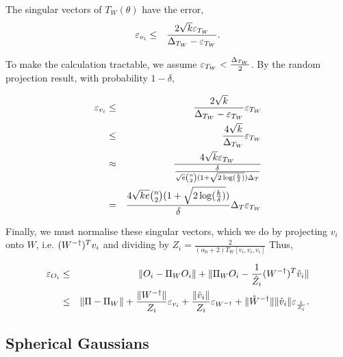 The singular vectors of $T_W(\theta)$ have the error,
\begin{eqnarray}
  \varepsilon_{v_i} 
    &\le& \frac{2 \sqrt{k} \varepsilon_{T_W}}{\Delta_{T_W} - \varepsilon_{T_W}}.
\end{eqnarray}

To make the calculation tractable, we assume $\varepsilon_{T_W}
< \frac{\Delta_{T_W}}{2}$. By the random projection result, with probability $1-\delta$,  

\begin{eqnarray}
  \varepsilon_{v_i} 
    &\le& \frac{2 \sqrt{k}}{\Delta_{T_W} - \varepsilon_{T_W}}  \varepsilon_{T_W}\\
    &\le& \frac{4 \sqrt{k}}{\Delta_{T_W}}  \varepsilon_{T_W}\\
    &\approx& \frac{4 \sqrt{k} \varepsilon_{T_W}}{\frac{\delta}{\sqrt{e} \binom{n}{2} (1 + \sqrt{2\log(\frac{k}{\delta})}) \Delta_{T}}} \\
    &=& \frac{4 \sqrt{ke} \binom{n}{2} (1 + \sqrt{2\log(\frac{k}{\delta})})}{\delta} \Delta_{T} \varepsilon_{T_W}
\end{eqnarray}


Finally, we must normalise these singular vectors, which we do by
projecting $v_i$ onto $W$, i.e. $(W^{-\dagger})^T v_i$ and dividing by $Z_i
= \frac{2}{(\alpha_0 + 2) T_W[v_i, v_i, v_i]}$ Thus, 

\begin{eqnarray}
  \varepsilon_{O_i} 
  &\le& \| O_i - \Pi_W O_i \| + \| \Pi_W O_i - \frac{1}{\hat{Z}_i} (W^{-\dagger})^T \hat{v}_i \| \\
  &\le& \|\Pi - \Pi_W\| 
  + \frac{\|W^{-\dagger}\|}{Z_i} \varepsilon_{v_i} 
  + \frac{\|\hat{v}_i\|}{Z_i} \varepsilon_{W^{-\dagger}} 
  + \|\hat{W}^{-\dagger}\| \|\hat{v}_i\| \varepsilon_{\frac{1}{Z_i}}.
\end{eqnarray}

\subsection{Spherical Gaussians}

